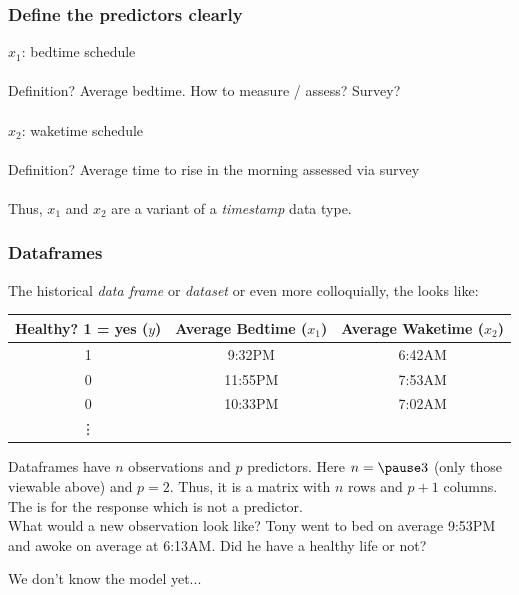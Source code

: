 \documentclass[slides]{beamer} %
\begin{document}
\begin{frame}\frametitle{Define the predictors clearly}

$x_1$: bedtime schedule \\~\\

Definition? \pause Average bedtime. \pause How to measure / assess? Survey? \\~\\	



$x_2$: waketime schedule \\~\\	

Definition? \pause Average time to rise in the morning assessed via survey\\~\\	

Thus, $x_1$ and $x_2$ are a variant of a \textit{timestamp} data type.

\end{frame}

\begin{frame}\frametitle{Dataframes}

\small
The historical \textit{data frame} or \textit{dataset} or even more colloquially, the  looks like:

\begin{table}
\centering
\small
\begin{tabular}{ccc}
Healthy? 1 = yes ($y$) & Average Bedtime ($x_1$) & Average Waketime ($x_2$) \\ \hline
1 & 9:32PM & 6:42AM \\
0 & 11:55PM & 7:53AM \\
0 & 10:33PM & 7:02AM \\
\vdots
\end{tabular}
\end{table}

Dataframes have $n$ observations and $p$ predictors. Here $n = \pause 3$ (only those viewable above) and $p = 2$. Thus, it is a matrix with $n$ rows and $p + 1$ columns. The  is for the response which is not a predictor. \\

What would a new observation look like? Tony went to bed on average 9:53PM and awoke on average at 6:13AM. Did he have a healthy life or not?

We don't know the model yet...
	
\end{frame}
\end{document}
